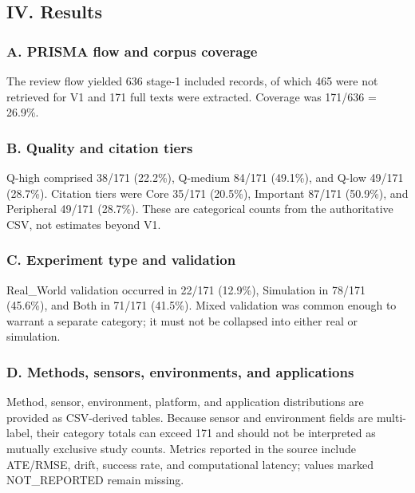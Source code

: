 \documentclass[
  journal,
  10pt]{IEEEtran}
\begin{document}
\subsection{IV. Results}\label{iv-results}

\subsubsection{A. PRISMA flow and corpus
coverage}\label{a-prisma-flow-and-corpus-coverage}

The review flow yielded 636 stage-1 included records, of which 465 were
not retrieved for V1 and 171 full texts were extracted. Coverage was
171/636 = 26.9\%.

\subsubsection{B. Quality and citation
tiers}\label{b-quality-and-citation-tiers}

Q-high comprised 38/171 (22.2\%), Q-medium 84/171 (49.1\%), and Q-low
49/171 (28.7\%). Citation tiers were Core 35/171 (20.5\%), Important
87/171 (50.9\%), and Peripheral 49/171 (28.7\%). These are categorical
counts from the authoritative CSV, not estimates beyond V1.

\subsubsection{C. Experiment type and
validation}\label{c-experiment-type-and-validation}

Real\_World validation occurred in 22/171 (12.9\%), Simulation in 78/171
(45.6\%), and Both in 71/171 (41.5\%). Mixed validation was common
enough to warrant a separate category; it must not be collapsed into
either real or simulation.

\subsubsection{D. Methods, sensors, environments, and
applications}\label{d-methods-sensors-environments-and-applications}

Method, sensor, environment, platform, and application distributions are
provided as CSV-derived tables. Because sensor and environment fields
are multi-label, their category totals can exceed 171 and should not be
interpreted as mutually exclusive study counts. Metrics reported in the
source include ATE/RMSE, drift, success rate, and computational latency;
values marked NOT\_REPORTED remain missing.
\end{document}
